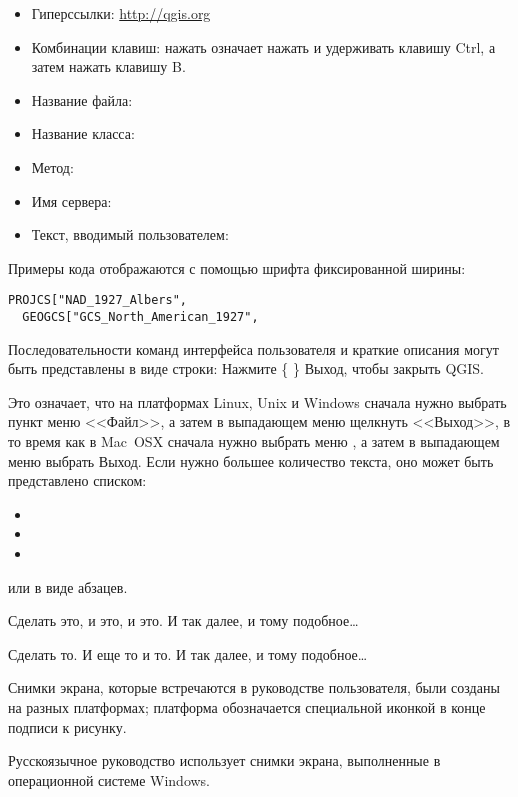 \begin{itemize}[label=--]
\item Гиперссылки: \url{http://qgis.org}
\item Комбинации клавиш: нажать  означает
нажать и удерживать клавишу Ctrl, а затем нажать клавишу B.
\item Название файла: 
\item Название класса: 
\item Метод: 
\item Имя сервера: 
\item Текст, вводимый пользователем: 
\end{itemize}

Примеры кода отображаются с помощью шрифта фиксированной ширины:
\begin{verbatim}
PROJCS["NAD_1927_Albers",
  GEOGCS["GCS_North_American_1927",
\end{verbatim}


Последовательности команд интерфейса пользователя и краткие описания
 могут быть представлены в виде строки: Нажмите \{\nix{}
\} \arrow Выход, чтобы закрыть QGIS.

Это означает, что на платформах Linux, Unix и Windows сначала нужно
выбрать пункт меню <<Файл>>, а затем в выпадающем меню щелкнуть <<Выход>>,
в то время как в Mac~OSX сначала нужно выбрать меню \qg,
а затем в выпадающем меню выбрать Выход. Если нужно большее количество
текста, оно может быть представлено списком:

\begin{itemize}
\item {}
\item {}
\item {}
\end{itemize}

или в виде абзацев.

\nix{} \osx{} Сделать это, и это, и это. И так далее, и тому подобное\dots

\win{}Сделать то. И еще то и то. И так далее, и тому подобное\dots

Снимки экрана, которые встречаются в руководстве пользователя, были
созданы на разных платформах; платформа обозначается специальной иконкой
в конце подписи к рисунку.

Русскоязычное руководство использует снимки экрана, выполненные в
операционной системе Windows.
